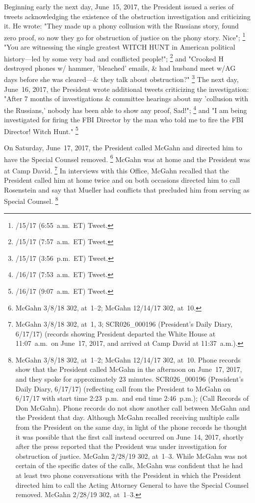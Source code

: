Beginning early the next day, June~15, 2017, the President issued a series of tweets acknowledging the existence of the obstruction investigation and criticizing it.
He wrote: "They made up a phony collusion with the Russians story, found zero proof, so now they go for obstruction of justice on the phony story.
Nice";%
\footnote{/15/17 (6:55~a.m.~ET) Tweet.}
"You are witnessing the single greatest WITCH HUNT in American political history---led by some very bad and conflicted people!";%
\footnote{/15/17 (7:57~a.m.~ET) Tweet.}
and "Crooked H destroyed phones w/ hammer, 'bleached' emails, \& had husband meet w/AG days before she was cleared---\& they talk about obstruction?"%
\footnote{/15/17 (3:56~p.m.~ET) Tweet.}
The next day, June~16, 2017, the President wrote additional tweets criticizing the investigation:
"After 7 months of investigations \& committee hearings about my 'collusion with the Russians,' nobody has been able to show any proof, Sad!";%
\footnote{/16/17 (7:53~a.m.~ET) Tweet.}
and "I am being investigated for firing the FBI Director by the man who told me to fire the FBI Director!
Witch Hunt."%
\footnote{/16/17 (9:07~a.m.~ET) Tweet.}

On Saturday, June~17, 2017, the President called McGahn and directed him to have the Special Counsel removed.%
\footnote{McGahn 3/8/18 302, at~1--2;
McGahn 12/14/17 302, at~10.}
McGahn was at home and the President was at Camp David.%
\footnote{McGahn 3/8/18 302, at~1, 3;
SCR026\_000196 (President's Daily Diary, 6/17/17) (records showing President departed the White House at 11:07~a.m.\ on June~17, 2017, and arrived at Camp David at 11:37~a.m.).}
In interviews with this Office, McGahn recalled that the President called him at home twice and on both occasions directed him to call Rosenstein and say that Mueller had conflicts that precluded him from serving as Special Counsel.%
\footnote{McGahn 3/8/18 302, at~1--2;
McGahn 12/14/17 302, at~10.
Phone records show that the President called McGahn in the afternoon on June~17, 2017, and they spoke for approximately 23 minutes.
SCR026\_000196 (President's Daily Diary, 6/17/17) (reflecting call from the President to McGahn on 6/17/17 with start time 2:23~p.m.\ and end time 2:46~p.m.);
(Call Records of Don McGahn).
Phone records do not show another call between McGahn and the President that day.
Although McGahn recalled receiving multiple calls from the President on the same day, in light of the phone records he thought it was possible that the first call instead occurred on June~14, 2017, shortly after the press reported that the President was under investigation for obstruction of justice.
McGahn 2/28/19 302, at~1--3.
While McGahn was not certain of the specific dates of the calls, McGahn was confident that he had at least two phone conversations with the President in which the President directed him to call the Acting Attorney General to have the Special Counsel removed.
McGahn 2/28/19 302, at~1--3.}

